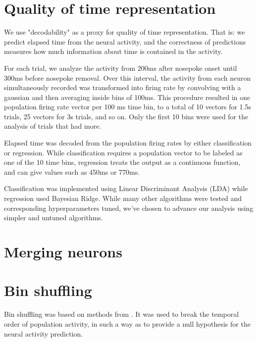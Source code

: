 \section{Quality of time representation}

    We use "decodability" as a proxy for quality of time representation. That is: we predict elapsed time from the neural activity, and the correctness of predictions measures how much information about time is contained in the activity. 
    
    For each trial, we analyze the activity from 200ms after nosepoke onset until 300ms before nosepoke removal. Over this interval, the activity from each neuron simultaneously recorded was transformed into firing rate by convolving with a gaussian and then averaging inside bins of 100ms. This procedure resulted in one population firing rate vector per 100 ms time bin, to a total of 10 vectors for 1.5s trials, 25 vectors for 3s trials, and so on. Only the first 10 bins were used for the analysis of trials that had more. 
    
    Elapsed time was decoded from the population firing rates by either classification or regression. While classification requires a population vector to be labeled as one of the 10 time bins, regression treats the output as a continuous function, and can give values such as 450ms or 770ms. 

    Classification was implemented using Linear Discriminant Analysis (LDA) while regression used Bayesian Ridge. While many other algorithms were tested and corresponding hyperparameters tuned, we've chosen to advance our analysis using simpler and untuned algorithms. 

\section{Merging neurons}
    
\section{Bin shuffling}
    Bin shuffling was based on methods from \cite{bakhurin2017differential}. It was used to break the temporal order of population activity, in such a way as to provide a null hypothesis for the neural activity prediction. 
